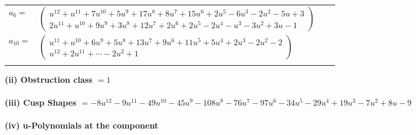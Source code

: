 \documentclass[1p]{elsarticle_modified}
\theoremstyle{definition}
\begin{document}
\begin{tabular}{m{7pt} m{180pt} m{7pt} m{180pt} }
\flushright $a_{6}=$&$\begin{pmatrix}u^{12}+u^{11}+7 u^{10}+5 u^9+17 u^8+8 u^7+15 u^6+2 u^5-6 u^3-2 u^2-5 u+3\\2 u^{11}+u^{10}+9 u^9+3 u^8+12 u^7+2 u^6+2 u^5-2 u^4- u^3-3 u^2+3 u-1\end{pmatrix}$ \\
\flushright $a_{10}=$&$\begin{pmatrix}u^{11}+u^{10}+6 u^9+5 u^8+13 u^7+9 u^6+11 u^5+5 u^4+2 u^3-2 u^2-2\\u^{12}+2 u^{11}+\cdots-2 u^2+1\end{pmatrix}$\\&\end{tabular}
\flushleft \textbf{(ii) Obstruction class $= 1$}\\~\\
\flushleft \textbf{(iii) Cusp Shapes $= -8 u^{12}-9 u^{11}-49 u^{10}-45 u^9-108 u^8-76 u^7-97 u^6-34 u^5-29 u^4+19 u^3-7 u^2+8 u-9$}\\~\\
\newpage\renewcommand{\arraystretch}{1}
\flushleft \textbf{(iv) u-Polynomials at the component}\newline \\
\end{document}
